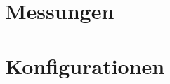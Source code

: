 \appendix

\section{Messungen}
\label{appendix:measures}


\section{Konfigurationen}
\label{appendix:configurations}

% 

% 



%  
% 

